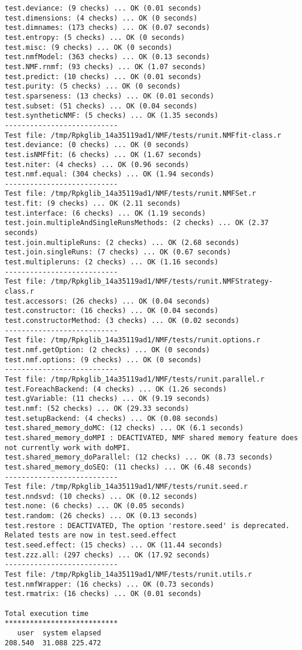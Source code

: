 \documentclass[10pt]{article}
\begin{document}
\begin{verbatim}
test.deviance: (9 checks) ... OK (0.01 seconds)
test.dimensions: (4 checks) ... OK (0 seconds)
test.dimnames: (173 checks) ... OK (0.07 seconds)
test.entropy: (5 checks) ... OK (0 seconds)
test.misc: (9 checks) ... OK (0 seconds)
test.nmfModel: (363 checks) ... OK (0.13 seconds)
test.NMF.rnmf: (93 checks) ... OK (1.07 seconds)
test.predict: (10 checks) ... OK (0.01 seconds)
test.purity: (5 checks) ... OK (0 seconds)
test.sparseness: (13 checks) ... OK (0.01 seconds)
test.subset: (51 checks) ... OK (0.04 seconds)
test.syntheticNMF: (5 checks) ... OK (1.35 seconds)
--------------------------- 
Test file: /tmp/Rpkglib_14a35119ad1/NMF/tests/runit.NMFfit-class.r 
test.deviance: (0 checks) ... OK (0 seconds)
test.isNMFfit: (6 checks) ... OK (1.67 seconds)
test.niter: (4 checks) ... OK (0.96 seconds)
test.nmf.equal: (304 checks) ... OK (1.94 seconds)
--------------------------- 
Test file: /tmp/Rpkglib_14a35119ad1/NMF/tests/runit.NMFSet.r 
test.fit: (9 checks) ... OK (2.11 seconds)
test.interface: (6 checks) ... OK (1.19 seconds)
test.join.multipleAndSingleRunsMethods: (2 checks) ... OK (2.37 seconds)
test.join.multipleRuns: (2 checks) ... OK (2.68 seconds)
test.join.singleRuns: (7 checks) ... OK (0.67 seconds)
test.multipleruns: (2 checks) ... OK (1.16 seconds)
--------------------------- 
Test file: /tmp/Rpkglib_14a35119ad1/NMF/tests/runit.NMFStrategy-class.r 
test.accessors: (26 checks) ... OK (0.04 seconds)
test.constructor: (16 checks) ... OK (0.04 seconds)
test.constructorMethod: (3 checks) ... OK (0.02 seconds)
--------------------------- 
Test file: /tmp/Rpkglib_14a35119ad1/NMF/tests/runit.options.r 
test.nmf.getOption: (2 checks) ... OK (0 seconds)
test.nmf.options: (9 checks) ... OK (0 seconds)
--------------------------- 
Test file: /tmp/Rpkglib_14a35119ad1/NMF/tests/runit.parallel.r 
test.ForeachBackend: (4 checks) ... OK (1.26 seconds)
test.gVariable: (11 checks) ... OK (9.19 seconds)
test.nmf: (52 checks) ... OK (29.33 seconds)
test.setupBackend: (4 checks) ... OK (0.08 seconds)
test.shared_memory_doMC: (12 checks) ... OK (6.1 seconds)
test.shared_memory_doMPI : DEACTIVATED, NMF shared memory feature does not currently work with doMPI.
test.shared_memory_doParallel: (12 checks) ... OK (8.73 seconds)
test.shared_memory_doSEQ: (11 checks) ... OK (6.48 seconds)
--------------------------- 
Test file: /tmp/Rpkglib_14a35119ad1/NMF/tests/runit.seed.r 
test.nndsvd: (10 checks) ... OK (0.12 seconds)
test.none: (6 checks) ... OK (0.05 seconds)
test.random: (26 checks) ... OK (0.13 seconds)
test.restore : DEACTIVATED, The option 'restore.seed' is deprecated. Related tests are now in test.seed.effect
test.seed.effect: (15 checks) ... OK (11.44 seconds)
test.zzz.all: (297 checks) ... OK (17.92 seconds)
--------------------------- 
Test file: /tmp/Rpkglib_14a35119ad1/NMF/tests/runit.utils.r 
test.nmfWrapper: (16 checks) ... OK (0.73 seconds)
test.rmatrix: (16 checks) ... OK (0.01 seconds)

Total execution time
***************************
   user  system elapsed 
208.540  31.088 225.472 

\end{verbatim}
\end{document}

